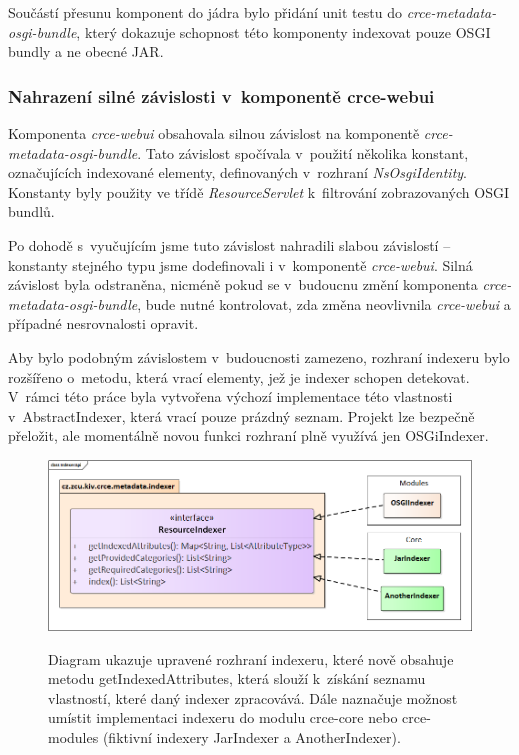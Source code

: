 \documentclass[12pt, a4paper]{article}
\begin{document}
Součástí přesunu komponent do jádra bylo přidání unit testu do \textit{crce-metadata-osgi-bundle}, který dokazuje schopnost této komponenty indexovat pouze OSGI bundly a ne obecné JAR.

\subsubsection{Nahrazení silné závislosti v~komponentě crce-webui}
Komponenta \textit{crce-webui} obsahovala silnou závislost na komponentě \textit{crce-metadata-osgi-bundle}. Tato závislost spočívala v~použití několika konstant, označujících indexované elementy, definovaných v~rozhraní \textit{NsOsgiIdentity}. Konstanty byly použity ve třídě \textit{ResourceServlet} k~filtrování zobrazovaných OSGI bundlů. 

Po dohodě s~vyučujícím jsme tuto závislost nahradili slabou závislostí -- konstanty stejného typu jsme dodefinovali i v~komponentě \textit{crce-webui}. Silná závislost byla odstraněna, nicméně pokud se v~budoucnu změní komponenta \textit{crce-metadata-osgi-bundle}, bude nutné kontrolovat, zda změna neovlivnila \textit{crce-webui} a případné nesrovnalosti opravit.

Aby bylo podobným závislostem v~budoucnosti zamezeno, rozhraní indexeru bylo rozšířeno o~metodu, která vrací elementy, jež je indexer schopen detekovat. V~rámci této práce byla vytvořena výchozí implementace této vlastnosti v~AbstractIndexer, která vrací pouze prázdný seznam. Projekt lze bezpečně přeložit, ale momentálně novou funkci rozhraní plně využívá jen OSGiIndexer.

\begin{figure}[h!]
\centering
\includegraphics[width=135mm]{indexerApi.png}
\label{fig:indexerApi}
\caption{Diagram ukazuje upravené rozhraní indexeru, které nově obsahuje metodu getIndexedAttributes, která slouží k~získání seznamu vlastností, které daný indexer zpracovává. Dále naznačuje možnost umístit implementaci indexeru do modulu crce-core nebo crce-modules (fiktivní indexery JarIndexer a AnotherIndexer).}
\end{figure}
\end{document}
